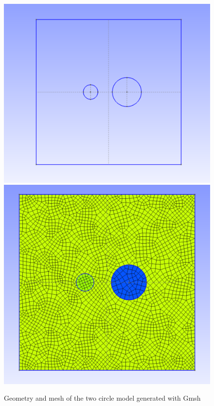 \documentclass[oneside,english,onecolumn,letterpaper]{book}
\begin{document}
\begin{figure}[htbp]
\centerline{\includegraphics[width=0.481\columnwidth]{figures/Gmsh_geo}\hspace*{2mm}\includegraphics[width=0.43\columnwidth]{figures/Gmsh_Msh}}
\caption{Geometry and mesh of the two circle model generated with Gmsh\label{fig:Gmsh-example}}
\end{figure}
\end{document}
